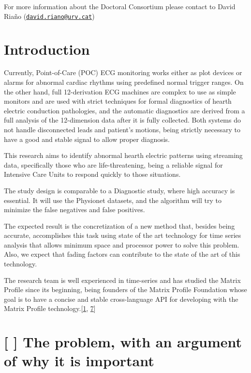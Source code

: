 \documentclass[runningheads]{llncs}
\begin{document}
For more information about the Doctoral Consortium please contact to
David Riaño
(\href{mailto:david.riano@urv.cat}{\nolinkurl{david.riano@urv.cat}})

\hypertarget{introduction}{%
\section{Introduction}\label{introduction}}

Currently, Point-of-Care (POC) ECG monitoring works either as plot
devices or alarms for abnormal cardiac rhythms using predefined normal
trigger ranges. On the other hand, full 12-derivation ECG machines are
complex to use as simple monitors and are used with strict techniques
for formal diagnostics of hearth electric conduction pathologies, and
the automatic diagnostics are derived from a full analysis of the
12-dimension data after it is fully collected. Both systems do not
handle disconnected leads and patient's motions, being strictly
necessary to have a good and stable signal to allow proper diagnosis.

This research aims to identify abnormal hearth electric patterns using
streaming data, specifically those who are life-threatening, being a
reliable signal for Intensive Care Units to respond quickly to those
situations.

The study design is comparable to a Diagnostic study, where high
accuracy is essential. It will use the Physionet datasets, and the
algorithm will try to minimize the false negatives and false positives.

The expected result is the concretization of a new method that, besides
being accurate, accomplishes this task using state of the art technology
for time series analysis that allows minimum space and processor power
to solve this problem. Also, we expect that fading factors can
contribute to the state of the art of this technology.

The research team is well experienced in time-series and has studied the
Matrix Profile since its beginning, being founders of the Matrix Profile
Foundation whose goal is to have a concise and stable cross-language API
for developing with the Matrix Profile
technology.{[}\protect\hyperlink{ref-Bischoff2019a}{1},
\protect\hyperlink{ref-VanBenschoten2020}{7}{]}

\hypertarget{the-problem-with-an-argument-of-why-it-is-important}{%
\section{{[} {]} The problem, with an argument of why it is
important}\label{the-problem-with-an-argument-of-why-it-is-important}}
\end{document}
